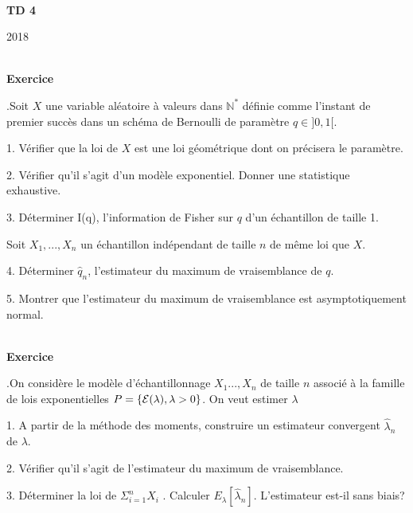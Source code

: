 \documentclass[11pt,a4paper]{article}
\newcommand{\N}{\mathbb{N}}\newcommand{\Q}{\mathbb{Q}}
\def \N{\mathbb{N}}
\def \Q{\mathbb{Q}}
\def \Ec{{\cal E}}
\newcounter{exo}
\def\exo{\mbox{}\\[0em]\hspace*{0em}\bf Exercice
\addtocounter{exo}{1}\arabic{exo}.\rm\hspace{1ex}}
\begin{document}
\centerline{\sc \MSA}  \centerline{~}
\vskip1cm \centerline{{\bf TD 4}} \centerline{2018}

\exo Soit $X$ une variable al\'eatoire \`a valeurs dans $\N^*$
d\'efinie comme l'instant de premier succ\`es dans un sch\'ema de
Bernoulli de param\`etre $q \in ]0, 1[$.

\vspace{3mm}

1. V\'erifier que la loi de $X$ est une loi g\'eom\'etrique dont
on pr\'ecisera le param\`etre.

\vspace{3mm}

2. V\'erifier qu'il s'agit d'un mod\`ele exponentiel. Donner une
statistique exhaustive.

\vspace{3mm}

3. D\'eterminer I(q), l'information de Fisher sur $q$ d'un
\'echantillon de taille 1.

\vspace{3mm}

Soit $X_1,...,X_n$ un \'echantillon ind\'ependant de taille $n$ de
m\^eme loi que $X$.

\vspace{3mm}

4. D\'eterminer $\hat q_n$, l'estimateur du maximum de
vraisemblance de $q$.

\vspace{3mm}

5. Montrer que l'estimateur du maximum de vraisemblance est
asymptotiquement normal.

\vspace{3mm}

\exo On consid\`ere le mod\`ele d'\'echantillonnage $X_1 ...,X_n$
de taille $n$ associ\'e \`a la famille de lois exponentielles $P =
\{\Ec(\lambda), \lambda>0\}$. On veut estimer $\lambda$

\vspace{3mm}

1. A partir de la m\'ethode des moments, construire un estimateur
convergent $\hat \lambda_n$ de $\lambda$.

\vspace{3mm}

2. V\'erifier qu'il s'agit de l'estimateur du maximum de
vraisemblance.

\vspace{3mm}

3. D\'eterminer la loi de $\Sigma_{i=1}^n  X_i$ . Calculer
$E_{\lambda}[\hat \lambda_n]$. L'estimateur est-il sans biais?
\end{document}
